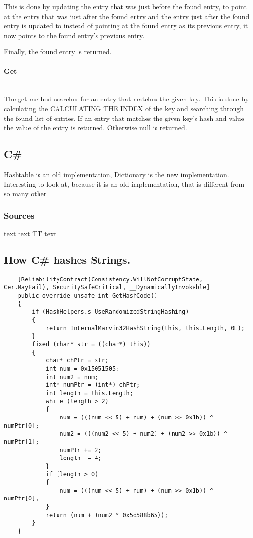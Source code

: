 \documentclass[titlepage]{article}
\newcommand{\myparagraph}[1]{\paragraph{#1}\mbox{}\\}
\begin{document}
	This is done by updating the entry that was just before the found entry, to point at the entry that was just after the found entry and the entry just after the found entry is updated to instead of pointing at the found entry as its previous entry, it now points to the found entry's previous entry. 
	
	Finally, the found entry is returned. 
	
	\myparagraph{Get}
	The get method searches for an entry that matches the given key. This is done by calculating the CALCULATING THE INDEX of the key and searching through the found list of entries. If an entry that matches the given key's hash and value the value of the entry is returned. Otherwise null is returned. 
			
	\subsection{C\#}
	Hashtable is an old implementation, Dictionary is the new implementation.
	Interesting to look at, because it is an old implementation, that is different from so many other 
	\subsubsection{Sources}
	\href{http://www.dotnetframework.org/default.aspx/DotNET/DotNET/8@0/untmp/whidbey/REDBITS/ndp/clr/src/BCL/System/Collections/Hashtable@cs/1/Hashtable@cs}{text}
	\href{http://social.msdn.microsoft.com/forums/vstudio/en-US/dc415bcb-68fe-4619-9c25-acd8924f731f/hash-table-buckets}{text}
	\href{http://en.wikipedia.org/wiki/Double_hashing}{TT}
	\href{https://social.msdn.microsoft.com/forums/vstudio/en-US/dc415bcb-68fe-4619-9c25-acd8924f731f/hash-table-buckets}{text}
	
	
	\subsection{How C\# hashes Strings.}
	\lstset{language=c++}
	\begin{lstlisting}
	[ReliabilityContract(Consistency.WillNotCorruptState, Cer.MayFail), SecuritySafeCritical, __DynamicallyInvokable]
	public override unsafe int GetHashCode()
	{
		if (HashHelpers.s_UseRandomizedStringHashing)
		{
			return InternalMarvin32HashString(this, this.Length, 0L);
		}
		fixed (char* str = ((char*) this))
		{
			char* chPtr = str;
			int num = 0x15051505;
			int num2 = num;
			int* numPtr = (int*) chPtr;
			int length = this.Length;
			while (length > 2)
			{
				num = (((num << 5) + num) + (num >> 0x1b)) ^ numPtr[0];
				num2 = (((num2 << 5) + num2) + (num2 >> 0x1b)) ^ numPtr[1];
				numPtr += 2;
				length -= 4;
			}
			if (length > 0)
			{
				num = (((num << 5) + num) + (num >> 0x1b)) ^ numPtr[0];
			}
			return (num + (num2 * 0x5d588b65));
		}
	}	
	\end{lstlisting}	
	
\end{document}
